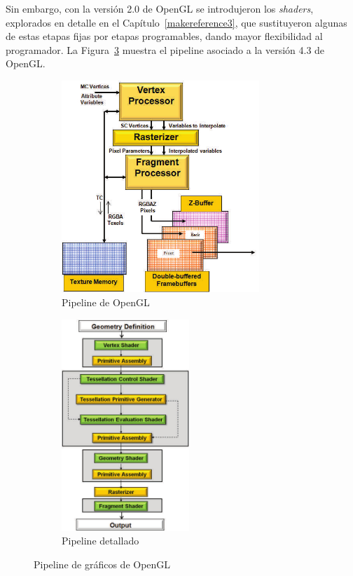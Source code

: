 Sin embargo, con la versión 2.0 de OpenGL se introdujeron los \textit{shaders},
explorados en detalle en el Capítulo~\ref{makereference3}, que sustituyeron
algunas de estas etapas fijas por etapas programables, dando mayor flexibilidad
al programador. La Figura~\ref{fig2.2} muestra el pipeline asociado a la versión
4.3 de OpenGL. 

\begin{figure}[h]%
	\begin{subfigure}[b]{.5\textwidth}
		\centering
		\includegraphics[height=8cm]{figures/pipeline.png}
		\caption{Pipeline de OpenGL}
		\label{fig2.2a}
	\end{subfigure}
	\begin{subfigure}[b]{.5\textwidth}
		\centering
		\includegraphics[height=8cm]{figures/pipelineExtendido.png}
		\caption{Pipeline detallado}
		\label{fig2.2b}
	\end{subfigure}
	\caption{Pipeline de gráficos de OpenGL}
	\label{fig2.2}
\end{figure}

